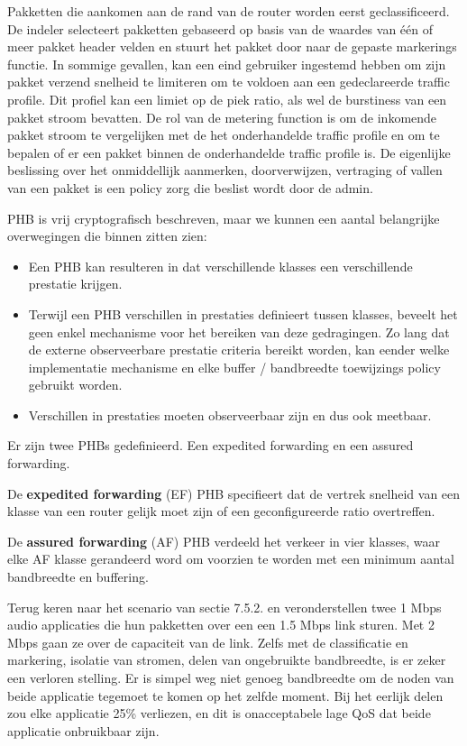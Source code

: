 \noindent Pakketten die aankomen aan de rand van de router worden eerst geclassificeerd. De indeler selecteert pakketten gebaseerd op basis van de waardes van één of meer pakket header velden en stuurt het pakket door naar de gepaste markerings functie. In sommige gevallen, kan een eind gebruiker ingestemd hebben om zijn pakket verzend snelheid te limiteren om te voldoen aan een gedeclareerde traffic profile. Dit profiel kan een limiet op de piek ratio, als wel de burstiness van een pakket stroom bevatten. De rol van de metering function is om de inkomende pakket stroom te vergelijken met de het onderhandelde traffic profile en om te bepalen of er een pakket binnen de onderhandelde traffic profile is. De eigenlijke beslissing over het onmiddellijk aanmerken, doorverwijzen, vertraging of vallen van een pakket is een policy zorg die beslist wordt door de admin.

\noindent PHB is vrij cryptografisch beschreven, maar we kunnen een aantal belangrijke overwegingen die binnen zitten zien:

\begin{itemize}
\item	Een PHB kan resulteren in dat verschillende klasses een verschillende prestatie krijgen.
\item	Terwijl een PHB verschillen in prestaties definieert tussen klasses, beveelt het geen enkel mechanisme voor het bereiken van deze gedragingen. Zo lang dat de externe observeerbare prestatie criteria bereikt worden, kan eender welke implementatie mechanisme en elke buffer / bandbreedte toewijzings policy gebruikt worden.
\item	Verschillen in prestaties moeten observeerbaar zijn en dus ook meetbaar.
\end{itemize}



\noindent Er zijn twee PHBs gedefinieerd. Een expedited forwarding en een assured forwarding.

\noindent De \textbf{expedited forwarding} (EF) PHB specifieert dat de vertrek snelheid van een klasse van een router gelijk moet zijn of een geconfigureerde ratio overtreffen.

\noindent De \textbf{assured forwarding} (AF) PHB verdeeld het verkeer in vier klasses, waar elke AF klasse gerandeerd word om voorzien te worden met een minimum aantal bandbreedte en buffering.


\noindent Terug keren naar het scenario van sectie 7.5.2. en veronderstellen twee 1 Mbps audio applicaties die hun pakketten over een een 1.5 Mbps link sturen. Met 2 Mbps gaan ze over de capaciteit van de link. Zelfs met de classificatie en markering, isolatie van stromen, delen van ongebruikte bandbreedte, is er zeker een verloren stelling. Er is simpel weg niet genoeg bandbreedte om de noden van beide applicatie tegemoet te komen op het zelfde moment. Bij het eerlijk delen zou elke applicatie 25\% verliezen, en dit is onacceptabele lage QoS dat beide applicatie onbruikbaar zijn.

